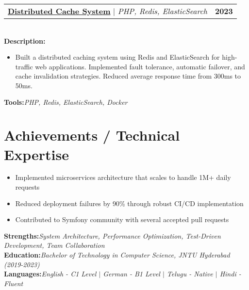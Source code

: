 \documentclass[letterpaper,11pt]{article}
\makeatletter
\newcommand{\resumeItem}[1]{
  \item\small{
    {#1 \vspace{-2pt}}
  }
}
\newcommand{\resumeProjectHeading}[2]{
    \item
    \begin{tabular*}{1.001\textwidth}{l@{\extracolsep{\fill}}r}
      \small#1 & \textbf{\small #2}\\
    \end{tabular*}\vspace{-7pt}
}
\newcommand{\resumeSubHeadingListStart}{\begin{itemize}[leftmargin=0.0in, label={}]}
\newcommand{\resumeSubHeadingListEnd}{\end{itemize}}
\newcommand{\resumeItemListStart}{\begin{itemize}}
\newcommand{\resumeItemListEnd}{\end{itemize}\vspace{-5pt}}
\makeatother
\begin{document}
\resumeProjectHeading
{\href{https://yakkshit.com}{\textbf{Distributed Cache System}} $|$ \emph{PHP, Redis, ElasticSearch}}{2023}\\
\vspace{6pt}
\textbf{Description:}
\vspace{-5pt}
\resumeItemListStart
\resumeItem{Built a distributed caching system using Redis and ElasticSearch for high-traffic web applications. Implemented fault tolerance, automatic failover, and cache invalidation strategies. Reduced average response time from 300ms to 50ms.}
\resumeItemListEnd
\vspace{4pt}
\textbf{Tools:}\emph{PHP, Redis, ElasticSearch, Docker}
\vspace{-12pt}

\section{Achievements / Technical Expertise}
\resumeSubHeadingListStart
\resumeItemListStart
\resumeItem{Implemented microservices architecture that scales to handle 1M+ daily requests}
\resumeItem{Reduced deployment failures by 90\% through robust CI/CD implementation}
\resumeItem{Contributed to Symfony community with several accepted pull requests}
\resumeItemListEnd

\resumeSubHeadingListEnd
\textbf{Strengths:}\emph{System Architecture, Performance Optimization, Test-Driven Development, Team Collaboration} \\
\textbf{Education:}\emph{Bachelor of Technology in Computer Science, JNTU Hyderabad (2019-2023)} \\
\textbf{Languages:}\emph{English - C1 Level $|$ German - B1 Level $|$ Telugu - Native $|$ Hindi - Fluent}

\vspace{10pt}
\end{document}
